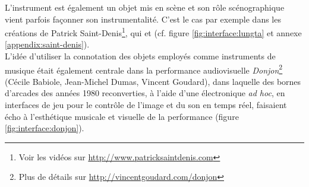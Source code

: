 \indent L'instrument est également un objet mis en scène et son rôle scénographique vient parfois façonner son instrumentalité. C'est le cas par exemple dans les créations de Patrick Saint-Denis\footnote{Voir les vidéos sur \url{http://www.patricksaintdenis.com}}, qui  et  (cf. figure \ref{fig:interface:lungta} et annexe \ref{appendix:saint-denis}).\\
\noindent L'idée d'utiliser la connotation des objets employés comme instruments de musique était également centrale dans la performance audiovisuelle \textit{Donjon}\footnote{Plus de détails sur \url{http://vincentgoudard.com/donjon}} (Cécile Babiole, Jean-Michel Dumas, Vincent Goudard), dans laquelle des bornes d'arcades des années 1980 reconverties, à l'aide d'une électronique \textit{ad hoc}, en interfaces de jeu pour le contrôle de l'image et du son en temps réel, faisaient écho à l'esthétique musicale et visuelle de la performance (figure \ref{fig:interface:donjon}).\\
